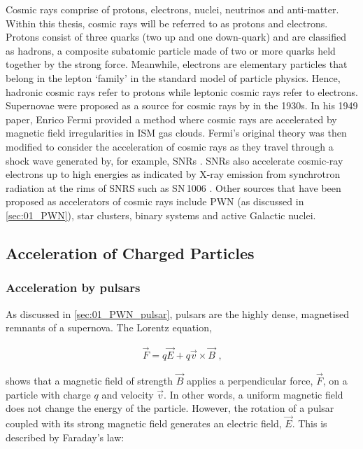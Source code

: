 \newpar
Cosmic rays comprise of protons, electrons, nuclei, neutrinos and anti-matter. Within this thesis, cosmic rays will be referred to as protons and electrons. Protons consist of three quarks (two up and one down-quark) and are classified as hadrons, a composite subatomic particle made of two or more quarks held together by the strong force. Meanwhile, electrons are elementary particles that belong in the lepton `family' in the standard model of particle physics. Hence, hadronic cosmic rays refer to protons while leptonic cosmic rays refer to electrons.
\newpar 
Supernovae were proposed as a source for cosmic rays by \cite{1934PNAS...20..259B} in the 1930s. In his 1949 paper, Enrico Fermi provided a method where cosmic rays are accelerated by magnetic field irregularities in ISM gas clouds. Fermi's original theory was then modified to consider the acceleration of cosmic rays as they travel through a shock wave generated by, for example, SNRs \citep{1977DoSSR.234.1306K,1977ICRC...11..132A,1978MNRAS.182..147B,1978MNRAS.182..443B,1978ApJ...221L..29B}. SNRs also accelerate cosmic-ray electrons up to high energies as indicated by X-ray emission from synchrotron radiation at the rims of SNRS such as \mbox{SN\,1006} \citep{1995Natur.378..255K}.
\newpar
Other sources that have been proposed as accelerators of cosmic rays include PWN (as discussed in \autoref{sec:01_PWN}), star clusters, binary systems and active Galactic nuclei.

\subsection{Acceleration of Charged Particles}

\subsubsection{Acceleration by pulsars}

As discussed in \autoref{sec:01_PWN_pulsar}, pulsars are the highly dense, magnetised remnants of a supernova. The Lorentz equation,

\begin{equation}
    \begin{aligned}
        \vec{F}=q\vec{E} + q\vec{v}\times \vec{B}\text{ ,}
    \end{aligned} \label{eq:chapter_1_lorentz_force}
\end{equation}

\noindent shows that a magnetic field of strength $\vec{B}$ applies a perpendicular force, $\vec{F}$, on a particle with charge $q$ and velocity $\vec{v}$. In other words, a uniform magnetic field does not change the energy of the particle. However, the rotation of a pulsar coupled with its strong magnetic field generates an electric field, $\vec{E}$. This is described by Faraday's law:
 
